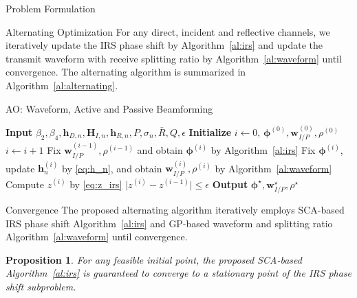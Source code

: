 \documentclass[journal]{IEEEtran}
\newtheorem{proposition}{Proposition}
\begin{document}
\begin{section}{Problem Formulation}
		\begin{subsection}{Alternating Optimization}
			For any direct, incident and reflective channels, we iteratively update the IRS phase shift by Algorithm~\ref{al:irs} and update the transmit waveform with receive splitting ratio by Algorithm~\ref{al:waveform} until convergence. The alternating algorithm is summarized in Algorithm~\ref{al:alternating}.
			\begin{algorithm}[!t]
				\caption{AO: Waveform, Active and Passive Beamforming}
				\label{al:alternating}
				\begin{algorithmic}[1]
					\State \textbf{Input} $\beta_2,\beta_4,\boldsymbol{h}_{D,n},\boldsymbol{H}_{I,n},\boldsymbol{h}_{R,n},P,\sigma_n,\bar{R},Q,\epsilon$
					\State \textbf{Initialize} $i \gets 0$, $\boldsymbol{\phi}^{(0)},\boldsymbol{w}_{I/P}^{(0)},\rho^{(0)}$
					\Repeat
						\State $i \gets i + 1$
						\State Fix $\boldsymbol{w}_{I/P}^{(i-1)},\rho^{(i-1)}$ and obtain $\boldsymbol{\phi}^{(i)}$ by Algorithm~\ref{al:irs}
						\State Fix $\boldsymbol{\phi}^{(i)}$, update $\boldsymbol{h}_n^{(i)}$ by \ref{eq:h_n}, and obtain $\boldsymbol{w}_{I/P}^{(i)}, \rho^{(i)}$ by Algorithm~\ref{al:waveform}
						\State Compute $z^{(i)}$ by \ref{eq:z_irs}
					\Until $\lvert z^{(i)} - z^{(i-1)} \rvert \le \epsilon$
					\State \textbf{Output} $\boldsymbol{\phi}^{\star}, \boldsymbol{w}_{I/P}^{\star}, \rho^{\star}$
				\end{algorithmic}
			\end{algorithm}
		\end{subsection}


		\begin{subsection}{Convergence}
			The proposed alternating algorithm iteratively employs SCA-based IRS phase shift Algorithm~\ref{al:irs} and GP-based waveform and splitting ratio Algorithm~\ref{al:waveform} until convergence.

			\begin{proposition}\label{pr:irs}
				For any feasible initial point, the proposed SCA-based Algorithm~\ref{al:irs} is guaranteed to converge to a stationary point of the IRS phase shift subproblem.
			\end{proposition}


\end{subsection}
\end{section}
\end{document}

